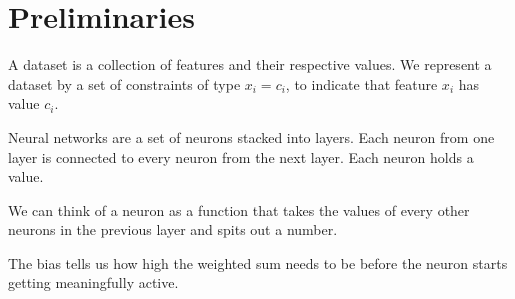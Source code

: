 \documentclass[12pt]{article}
\begin{document}
\section{Preliminaries}



A dataset is a collection of features and their respective values.
We represent a dataset by a set of constraints of type $x_i = c_i$, to indicate that feature $x_i$ has value $c_i$.


Neural networks are a set of neurons stacked into layers.
Each neuron from one layer is connected to every neuron from the next layer.
Each neuron holds a value.


We can think of a neuron as a function that takes the values of every other neurons in the previous layer and spits out a number.

The bias tells us how high the weighted sum needs to be before the neuron starts getting meaningfully active.


\end{document}
